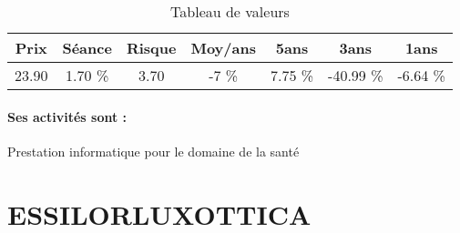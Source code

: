 \documentclass[11pt,a4paper]{report}%
\begin{document}
\begin{table}[H]
  \centering
    \begin{tabular}{|c|c|c|c|c|c|c|}
    \hline
    Prix & Séance & Risque  & Moy/ans & 5ans & 3ans & 1ans \\
    \hline
    23.90 &    1.70 \%    & 3.70 & -7 \% & 7.75 \% & -40.99 \% & -6.64 \% \\
    \hline
    \end{tabular}%
        \label{tab:table_CEGEDIM}%
      \caption{Tableau de valeurs}
\end{table}%

\paragraph{Ses activités sont : } Prestation informatique pour le domaine de la santé 
    
    \newpage

\section{ESSILORLUXOTTICA}
\end{document}
